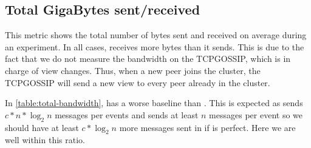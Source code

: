\subsection{Total GigaBytes sent/received}
This metric shows the total number of bytes sent and received on average during an experiment.
In all cases, \jgroups receives more bytes than it sends. This is due to the fact that we do not measure the bandwidth on the TCPGOSSIP, which is in charge of view changes. Thus, when a new peer joins the cluster, the TCPGOSSIP will send a new view to every peer already in the cluster.
\par
\begin{table}[hpt]
	\centering
	\caption{Total \si{\giga\byte} sent/received in a stable system}
	\label{table:total-bandwidth} 
\end{table}
In \autoref{table:total-bandwidth}, \epto has a worse baseline than \jgroups. This is expected as \epto sends $c*n*\log_2 n$ messages per events and \jgroups sends at least $n$ messages per event so we should have at least $c*\log_2 n$ more messages sent in \epto if \jgroups is perfect. Here we are well within this ratio.
